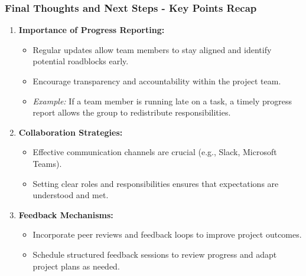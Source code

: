 \documentclass[aspectratio=169]{beamer}
\begin{document}
\begin{frame}[fragile]
    \frametitle{Final Thoughts and Next Steps - Key Points Recap}
    
    \begin{enumerate}
        \item \textbf{Importance of Progress Reporting:}
        \begin{itemize}
            \item Regular updates allow team members to stay aligned and identify potential roadblocks early.
            \item Encourage transparency and accountability within the project team.
            \item \textit{Example:} If a team member is running late on a task, a timely progress report allows the group to redistribute responsibilities.
        \end{itemize}
        
        \item \textbf{Collaboration Strategies:}
        \begin{itemize}
            \item Effective communication channels are crucial (e.g., Slack, Microsoft Teams).
            \item Setting clear roles and responsibilities ensures that expectations are understood and met.
        \end{itemize}
        
        \item \textbf{Feedback Mechanisms:}
        \begin{itemize}
            \item Incorporate peer reviews and feedback loops to improve project outcomes.
            \item Schedule structured feedback sessions to review progress and adapt project plans as needed.
        \end{itemize}
    \end{enumerate}
\end{frame}
\end{document}
